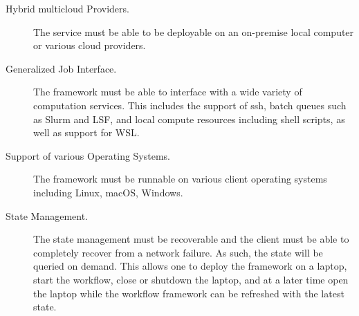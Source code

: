 \begin{description}
\item[Hybrid multicloud Providers.] The service must be able to be deployable
on an on-premise local computer or various cloud providers.

\item[Generalized Job Interface.] The framework must be able to interface 
with a wide variety of computation services. This includes the support
of ssh, batch queues such as Slurm and LSF, and local compute resources
including shell scripts, as well as support for WSL.

\item[Support of various Operating Systems.] The framework must be runnable on
various client operating systems including Linux, macOS, Windows.

\item[State Management.] The state management must be recoverable and the
client must be able to completely recover from a network failure.
As such, the state will be queried on demand. This allows one to deploy
the framework on a laptop, start the workflow, close or shutdown the
laptop, and at a later time open the laptop while the workflow framework
can be refreshed with the latest state.

\end{description}
